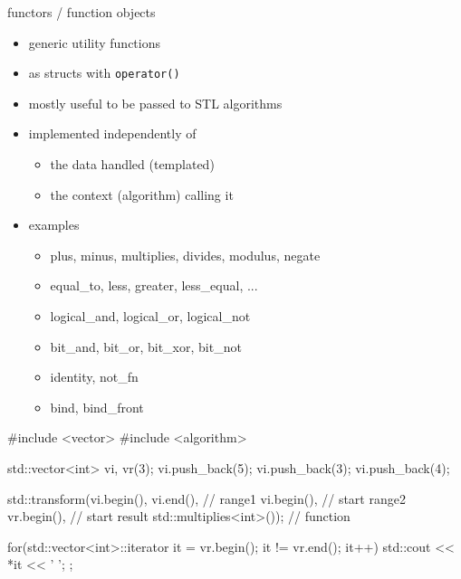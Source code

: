 \begin{frame}[fragile]
  \begin{block}{functors / function objects}
    \begin{itemize}
      \item generic utility functions
      \item as structs with \texttt{operator()}
      \item mostly useful to be passed to STL algorithms
    \item implemented independently of
      \begin{itemize}
      \item the data handled (templated)
      \item the context (algorithm) calling it
      \end{itemize}
    \item examples
      \begin{itemize}
      \item plus, minus, multiplies, divides, modulus, negate
      \item equal\_to, less, greater, less\_equal, ...
      \item logical\_and, logical\_or, logical\_not
      \item bit\_and, bit\_or, bit\_xor, bit\_not
      \item identity, not\_fn
      \item bind, bind\_front
      \end{itemize}
    \end{itemize}
  \end{block}
\end{frame}


\begin{frame}[fragile]
  \begin{cppcode*}{}
    #include <vector>
    #include <algorithm>

    std::vector<int> vi, vr(3);
    vi.push_back(5); vi.push_back(3); vi.push_back(4);

    std::transform(vi.begin(), vi.end(),      // range1
                   vi.begin(),          // start range2
                   vr.begin(),          // start result
                   std::multiplies<int>()); // function

    for(std::vector<int>::iterator it = vr.begin();
        it != vr.end();
        it++) {
      std::cout << *it << ' ';
    };
  \end{cppcode*}
\end{frame}

